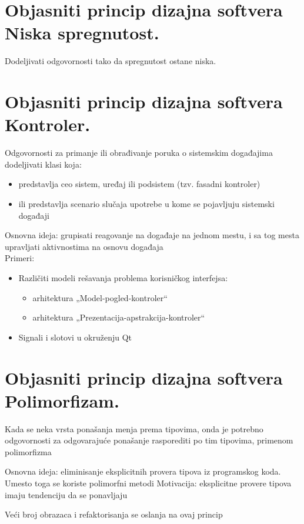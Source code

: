 \documentclass[a4paper]{article}
\begin{document}
\section{Objasniti princip dizajna softvera Niska spregnutost.}
Dodeljivati odgovornosti tako da spregnutost ostane niska.

\section{Objasniti princip dizajna softvera Kontroler.}
Odgovornosti za primanje ili obrađivanje poruka o sistemskim događajima dodeljivati klasi koja:
 \begin{itemize}
   \item predstavlja ceo sistem, uređaj ili podsistem (tzv. fasadni kontroler) 
   \item ili predstavlja scenario slučaja upotrebe u kome se pojavljuju sistemski događaji\\
 \end{itemize}
 
Osnovna ideja: grupisati reagovanje na događaje na jednom mestu, i sa tog mesta upravljati aktivnostima na osnovu događaja\\

Primeri:
 \begin{itemize}
   \item Različiti modeli rešavanja problema korisničkog interfejsa:
    \begin{itemize}
     \item arhitektura „Model-pogled-kontroler“
     \item arhitektura „Prezentacija-apstrakcija-kontroler“
    \end{itemize}
   \item Signali i slotovi u okruženju Qt
 \end{itemize}

\section{Objasniti princip dizajna softvera Polimorfizam.}
Kada se neka vrsta ponašanja menja prema tipovima, onda je potrebno odgovornosti za odgovarajuće ponašanje rasporediti po tim tipovima, primenom polimorfizma

Osnovna ideja: eliminisanje eksplicitnih provera tipova iz programskog koda. Umesto toga se koriste polimorfni metodi
Motivacija: eksplicitne provere tipova imaju tendenciju da se ponavljaju

Veći broj obrazaca i refaktorisanja se oslanja na ovaj princip
\end{document}
